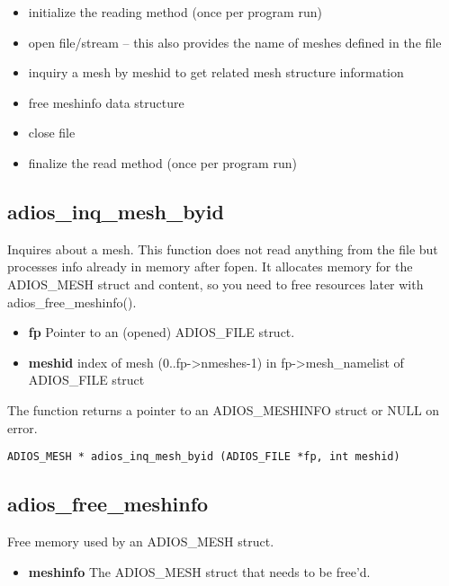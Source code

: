 \begin{itemize}
\renewcommand{\labelitemi}{$-$}
\item initialize the reading method (once per program run)

\item open file/stream  -- this also provides the name of meshes defined in the file

\item inquiry a mesh by meshid to get related mesh structure information

\item free meshinfo data structure

\item close file

\item finalize the read method (once per program run)
\end{itemize}

\subsection{adios\_inq\_mesh\_byid}

\noindent Inquires about a mesh. This function does not read anything from the file but processes info already in memory after fopen. It allocates memory for the ADIOS\_MESH struct and content, so you need to free resources later with adios\_free\_meshinfo().

\begin{itemize}
\item{\bf fp} Pointer to an (opened) ADIOS\_FILE struct.
\item{\bf meshid}    index of mesh (0..fp->nmeshes-1)
in fp->mesh\_namelist of ADIOS\_FILE struct
\end{itemize}

\noindent The function returns a pointer to an ADIOS\_MESHINFO struct or NULL on error. 

\begin{lstlisting}
ADIOS_MESH * adios_inq_mesh_byid (ADIOS_FILE *fp, int meshid)
\end{lstlisting}

\subsection{adios\_free\_meshinfo}

\noindent Free memory used by an ADIOS\_MESH struct.

\begin{itemize}
\item{\bf meshinfo} The ADIOS\_MESH struct that needs to be free'd.
\end{itemize}

